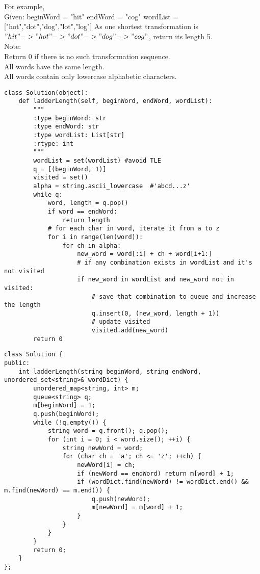 For example,\\
Given:
beginWord = "hit"
endWord = "cog"
wordList = ["hot","dot","dog","lot","log"]
As one shortest transformation is $"hit" -> "hot" -> "dot" -> "dog" -> "cog"$,
return its length 5.\\

Note:\\
    Return 0 if there is no such transformation sequence.\\
    All words have the same length.\\
    All words contain only lowercase alphabetic characters.\

\begin{lstlisting}
class Solution(object):
    def ladderLength(self, beginWord, endWord, wordList):
        """
        :type beginWord: str
        :type endWord: str
        :type wordList: List[str]
        :rtype: int
        """
        wordList = set(wordList) #avoid TLE
        q = [(beginWord, 1)]
        visited = set()
        alpha = string.ascii_lowercase  #'abcd...z'
        while q:
            word, length = q.pop()
            if word == endWord:
                return length
            # for each char in word, iterate it from a to z
            for i in range(len(word)):
                for ch in alpha:
                    new_word = word[:i] + ch + word[i+1:]
                    # if any combination exists in wordList and it's not visited
                    if new_word in wordList and new_word not in visited:
                        # save that combination to queue and increase the length
                        q.insert(0, (new_word, length + 1))
                        # update visited
                        visited.add(new_word)
        return 0
\end{lstlisting}


\begin{lstlisting}
class Solution {
public:
    int ladderLength(string beginWord, string endWord, unordered_set<string>& wordDict) {
        unordered_map<string, int> m;
        queue<string> q;
        m[beginWord] = 1;
        q.push(beginWord);
        while (!q.empty()) {
            string word = q.front(); q.pop();
            for (int i = 0; i < word.size(); ++i) {
                string newWord = word;
                for (char ch = 'a'; ch <= 'z'; ++ch) {
                    newWord[i] = ch;
                    if (newWord == endWord) return m[word] + 1;
                    if (wordDict.find(newWord) != wordDict.end() && m.find(newWord) == m.end()) {
                        q.push(newWord);
                        m[newWord] = m[word] + 1;
                    }   
                }
            }
        }
        return 0;
    }
};
\end{lstlisting}


